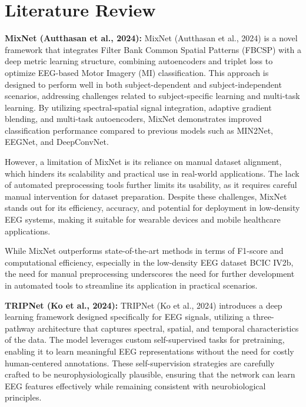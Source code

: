 \section{Literature Review}
\label{sec:literature-review}

\textbf{MixNet (Autthasan et al., 2024):}
MixNet (Autthasan et al., 2024) is a novel framework that integrates Filter Bank Common Spatial Patterns (FBCSP) with a deep metric learning structure, combining autoencoders and triplet loss to optimize EEG-based Motor Imagery (MI) classification. This approach is designed to perform well in both subject-dependent and subject-independent scenarios, addressing challenges related to subject-specific learning and multi-task learning. By utilizing spectral-spatial signal integration, adaptive gradient blending, and multi-task autoencoders, MixNet demonstrates improved classification performance compared to previous models such as MIN2Net, EEGNet, and DeepConvNet.

However, a limitation of MixNet is its reliance on manual dataset alignment, which hinders its scalability and practical use in real-world applications. The lack of automated preprocessing tools further limits its usability, as it requires careful manual intervention for dataset preparation. Despite these challenges, MixNet stands out for its efficiency, accuracy, and potential for deployment in low-density EEG systems, making it suitable for wearable devices and mobile healthcare applications.

While MixNet outperforms state-of-the-art methods in terms of F1-score and computational efficiency, especially in the low-density EEG dataset BCIC IV2b, the need for manual preprocessing underscores the need for further development in automated tools to streamline its application in practical scenarios.

\vspace{0.5em}
\newpage
\textbf{TRIPNet (Ko et al., 2024):}
TRIPNet (Ko et al., 2024) introduces a deep learning framework designed specifically for EEG signals, utilizing a three-pathway architecture that captures spectral, spatial, and temporal characteristics of the data. The model leverages custom self-supervised tasks for pretraining, enabling it to learn meaningful EEG representations without the need for costly human-centered annotations. These self-supervision strategies are carefully crafted to be neurophysiologically plausible, ensuring that the network can learn EEG features effectively while remaining consistent with neurobiological principles.

